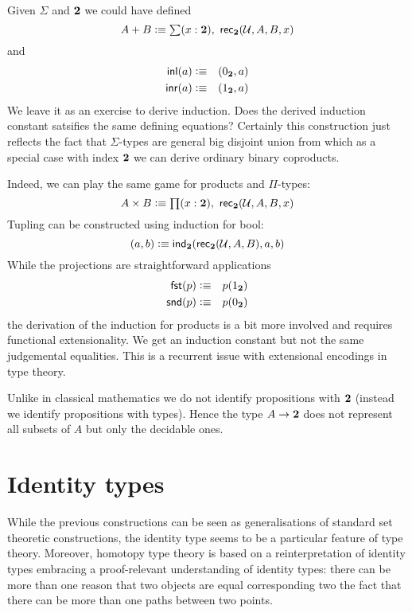 Given $\Sigma$ and $\mathbf{2}$ we could have defined
\[ A + B \defeq \sm{x:\bool} \rec{\bool}(\UU,A,B,x) \]
and
\begin{eqnarray*}
  \mathsf{inl}(a) & \vcentcolon\equiv & ( 0_{\mathbf{2}},a) \\
  \mathsf{inr}(a) & \vcentcolon\equiv & ( 1_{\mathbf{2}},a) \\
\end{eqnarray*}
We leave it as an exercise to derive induction. Does the derived
induction constant satsifies the same defining equations?
Certainly this construction just reflects the fact that
$\Sigma$-types are general big disjoint union from which as a
special case with index $\mathbf{2}$ we can derive ordinary binary
coproducts. 

Indeed, we can play the same game for products and $\Pi$-types:
\[ A \times B \defeq \prd{x:\bool}\rec{\bool}(\UU,A,B,x) \]
Tupling can be constructed using induction for bool:
\[ ( a,b) \vcentcolon\equiv \mathsf{ind}_{\mathbf{2}}(\mathsf{rec}_{\mathbf{2}}(\mathcal{U},A,B),a,b) \]
While the projections are straightforward applications
\begin{eqnarray*}
  \mathsf{fst}(p) & \vcentcolon\equiv & p(1_{\mathbf{2}}) \\
  \mathsf{snd}(p) & \vcentcolon\equiv & p(0_{\mathbf{2}}) \\
\end{eqnarray*}
the derivation of the induction for products is a bit more
involved and requires functional extensionality. We get an
induction constant but not the same judgemental equalities.
This is a recurrent issue with extensional encodings in type
theory. 

Unlike in classical mathematics we
do not identify propositions with $\mathbf{2}$ (instead we identify
propositions with types). Hence the type $A \to \mathbf{2}$ does not
represent all subsets of $A$ but only the decidable ones.

\section{Identity types}
\label{sec:identity-types}

While the previous constructions can be seen as generalisations of
standard set theoretic constructions, the identity type seems to be
a particular feature of type theory. Moreover, homotopy type theory is
based on a reinterpretation of identity types embracing a
proof-relevant understanding of identity types: there can be more than
one reason that two objects are equal corresponding two the fact that
there can be more than one paths between two points.

